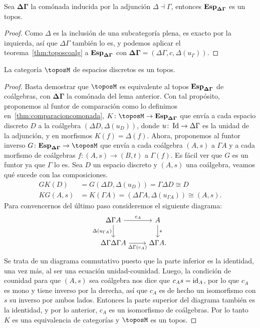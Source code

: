 \begin{lemma}[label=lem:toposdeltagammacoalg]
  Sea $\bm{\Delta\Gamma}$ la comónada inducida por la adjunción $\Delta\dashv\Gamma$, entonces $\mathbf{Esp}_{\bm{\Delta\Gamma}}$ es un topos.
\end{lemma}
\begin{proof}
  Como $\Delta$ es la inclusión de una subcategoría plena, es exacto por la izquierda, así que $\Delta\Gamma$ también lo es, 
  y podemos aplicar el teorema~\ref{thm:toposcoalg} a $\mathbf{Esp}_{\bm{\Delta\Gamma}}$ con $\bm{\Delta\Gamma}=(\Delta\Gamma,c,\Delta(u_\Gamma))$.
\end{proof}

\begin{theorem}[label=thm:toposdiscretos]
  La categoría $\toposM$ de espacios discretos es un topos.
\end{theorem}
\begin{proof}
  Basta demostrar que $\toposM$ es equivalente al topos $\mathbf{Esp}_{\bm{\Delta\Gamma}}$ de coálgebras, con
  $\bm{\Delta\Gamma}$ la comónada del lema anterior. Con tal propósito, proponemos al funtor
  de comparación como lo definimos en~\ref{thm:comparacioncomonada}, $K\colon\toposM\to\esp_{\bm{\Delta\Gamma}}$ que envía a cada espacio discreto $D$ a la coálgebra 
  $(\Delta D, \Delta(u_D))$, donde $u\colon\operatorname{Id}\to\Delta\Gamma$ es la unidad de la adjunción, y en 
  morfismos $K(f) = \Delta(f)$. Ahora, proponemos al funtor inverso $G\colon \esp_{\bm{\Delta\Gamma}}\to\toposM$ 
  que envía a cada coálgebra $(A,s)$ a $\Gamma A$ y a cada morfismo de coálgebras $f\colon (A,s)\to (B,t)$ a $\Gamma(f)$.
  Es fácil ver que $G$ es un funtor ya que $\Gamma$ lo es. Sea $D$ un espacio discreto y 
  $(A,s)$ una coálgebra, veamos qué sucede con las composiciones.
  \begin{align*}
    GK(D) &= G(\Delta D, \Delta(u_D)) = \Gamma\Delta D \cong D \\
    KG(A,s) &= K(\Gamma A) = (\Delta\Gamma A, \Delta(u_{\Gamma A})) \cong (A,s).
  \end{align*}
  Para convencernos del último paso consideremos el siguiente diagrama:
  \begin{equation*}
    \begin{tikzcd}
      \Delta\Gamma A\ar[swap]{d}{\Delta(u_{\Gamma A})}\ar{r}{c_A} & A\ar{d}{s} \\
      \Delta\Gamma\Delta\Gamma A\ar[swap]{r}{\Delta\Gamma(c_A)} & \Delta\Gamma A.
    \end{tikzcd}
  \end{equation*}
  Se trata de un diagrama conmutativo puesto que la parte inferior es la identidad, 
  una vez más, al ser una ecuación unidad-counidad. Luego, la condición de counidad para que
  $(A,s)$ sea coálgebra nos dice que $c_As = \operatorname{id}_A$, por lo que $c_A$ es mono y tiene inverso por la derecha,
  así que $c_A$ es de hecho un isomorfismo con $s$ su inverso por ambos lados. Entonces la parte superior
  del diagrama también es la identidad, y por lo anterior, $c_A$ es un isomorfismo de coálgebras.
  Por lo tanto $K$ es una equivalencia de categorías y $\toposM$ es un topos.
\end{proof}


